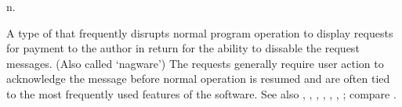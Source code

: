  n.

A type of  that frequently disrupts normal program operation to display requests for payment to the author in return
for the ability to dissable the request messages. (Also called `nagware') The requests generally require user action to acknowledge the
message before normal operation is resumed and are often tied to the most frequently used features of the software. See also
, , , , , ,
; compare .

